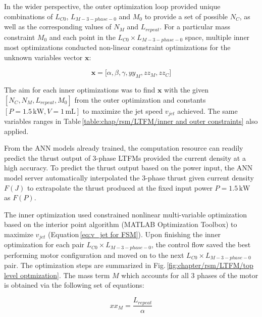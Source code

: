     
                In the wider perspective, the outer optimization loop provided unique combinations of $L_{C0}$, $L_{M-3-phase-0}$ and $M_0$ to provide a set of possible $N_C$, as well as the corresponding values of $N_M$ and $L_{repeat}$. For a particular mass constraint $M_0$ and each point in the $L_{C0}\times L_{M-3-phase-0}$ space, multiple inner most optimizations conducted non-linear constraint optimizations for the unknown variables vector $\textbf{x}$:
                
                
                \begin{equation}
                    \textbf{x} = \big[ \alpha,\beta,\gamma, yy_M, zz_M, zz_C \big]
                    \label{eq:chap/rsm/LTFM/optimization output}
                \end{equation}
                
                
                The aim for each inner optimizations was to find $\textbf{x}$ with the given $[N_C,N_M,L_{repeat},M_0]$ from the outer optimization and constants $[P=1.5\,\mathrm{kW},V=1\,\mathrm{mL}]$ to maximize the jet speed $v_{jet}$ achieved. The same variables ranges in Table\,\ref{table:chap/rsm/LTFM/inner and outer constraints} also applied. 
                
                
                From the \acs{ANN} models already trained, the computation resource can readily predict the thrust output of 3-phase \acsp{LTFM} provided the current density at a high accuracy. To predict the thrust output based on the power input, the \acs{ANN} model server automatically interpolated the 3-phase thrust given current density $F(J)$ to extrapolate the thrust produced at the fixed input power $P=1.5\,\mathrm{kW}$ as $F(P)$.
                
                
                The inner optimization used constrained nonlinear multi-variable optimization based on the interior point algorithm (MATLAB Optimization Toolbox) to maximize $v_{jet}$ (Equation\,\ref{eq:v_jet for FSM}). Upon finishing the inner optimization for each pair $L_{C0}\times L_{M-3-phase-0}$, the control flow saved the best performing motor configuration and moved on to the next $L_{C0}\times L_{M-3-phase-0}$ pair. The optimization steps are summarized in Fig.\,\ref{fig:chapter/rsm/LTFM/top level optmization}. The mass term $M$ which accounts for all 3 phases of the motor is obtained via the following set of equations:
                
                
                    \begin{equation}
                        xx_M = \frac{L_{repeat}}{\alpha}
                        \label{eq:chap/rsm/LTFM/mass/xx_m}
                    \end{equation}
                    
